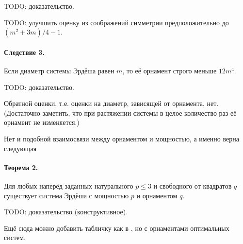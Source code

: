 \documentclass[a4paper,14pt]{article} %
\begin{document}
TODO: доказательство.

TODO: улучшить оценку из соображений симметрии предположительно до $(m^2+3m)/4 - 1$.

\paragraph{Следствие 3.}
Если диаметр системы Эрдёша равен $m$, то её орнамент строго меньше $12m^4$.

TODO: доказательство.

Обратной оценки, т.е. оценки на диаметр, зависящей от орнамента, нет.
(Достаточно заметить, что при растяжении системы в целое количество раз её орнамент не изменяется.)

Нет и подобной взаимосвязи между орнаментом и мощностью, а именно верна следующая
\paragraph{Теорема 2.}
Для любых наперёд заданных натурального $p\leq 3$ и свободного от квадратов $q$
существует система Эрдёша с мощностью $p$ и орнаментом $q$.

TODO: доказательство (конструктивное).


Ещё сюда можно добавить табличку как в \cite{our-mz-rus},
но с орнаментами оптимальных систем.

\printbibliography
\end{document}
